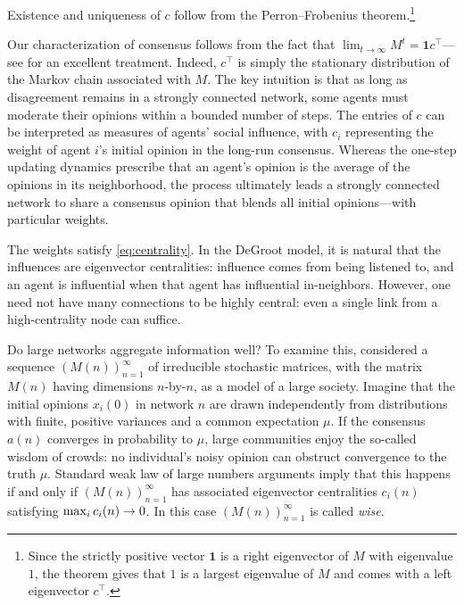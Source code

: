 \documentclass{notices}
\theoremstyle{definition}\newtheorem{problem}{Problem}
\theoremstyle{definition} \newtheorem{remark}{Remark}
\theoremstyle{definition} \newtheorem{claim}{Claim}
\renewcommand{\max}{\operatornamewithlimits{max}}
\theoremstyle{definition} \newtheorem{thm}{Theorem}
\theoremstyle{definition} \newtheorem*{thmNoNum}{Theorem}
\theoremstyle{definition} \newtheorem{definition}{Definition}
\theoremstyle{definition} \theoremstyle{remark}
\theoremstyle{definition} \newtheorem{note}{Note}
\theoremstyle{definition} \newtheorem{notation}{Notation}
\theoremstyle{definition} \theoremstyle{plain}
\theoremstyle{definition} \newtheorem{condition}{Condition}
\theoremstyle{definition} \newtheorem{lem}{Lemma}
\theoremstyle{definition} \newtheorem{corollary}{Corollary}
\theoremstyle{definition} \newtheorem{prop}{Proposition}
\theoremstyle{definition} \newtheorem{ax}{Axiom}
\theoremstyle{definition} \newtheorem{assumption}{Assumption}
\theoremstyle{definition} \newtheorem{example}{Example}
\theoremstyle{definition} \newtheorem{rmk}{Remark}
\theoremstyle{definition} \newtheorem{res}{Result}
\theoremstyle{definition} \newtheorem{que}{Question}
\theoremstyle{definition} \newtheorem{conjecture}{Conjecture}
\theoremstyle{definition}
\begin{document}
Existence and uniqueness of $c$ follow from the Perron--Frobenius theorem.\footnote{Since the strictly positive vector $\bm{1}$ is a right eigenvector of $M$ with eigenvalue $1$, the theorem gives that $1$ is a largest eigenvalue of $M$ and comes with a left eigenvector $c^\top$.} 

Our characterization of consensus follows from the fact that $\lim_{t \to \infty} M^t = \mathbf{1}  c^\top$---see \cite[Ch. 8]{meyer-book} for an excellent treatment. Indeed, $c^\top$ is simply the stationary distribution of the Markov chain associated with $M$. The key intuition is that as long as disagreement remains in a strongly connected network, some agents must moderate their opinions within a bounded number of steps. The entries of $c$ can be interpreted as measures of agents' social influence, with $c_i$ representing the weight of agent $i$'s initial opinion in the long-run consensus. Whereas the one-step updating dynamics prescribe that an agent's opinion is the average of the opinions in its neighborhood,  the process ultimately leads a strongly connected network to share a consensus opinion that blends all initial opinions---with particular weights.

The weights satisfy \cref{eq:centrality}. In the DeGroot model, it is natural that the influences are eigenvector centralities: influence comes from being listened to, and  an agent is influential when that agent has influential in-neighbors. However, one need not have many connections to be highly central: even a single link from a high-centrality node can suffice. 


Do large networks aggregate information well? To examine this, \cite{GolubJackson2010} considered a sequence $(M(n))_{n=1}^\infty$ of irreducible stochastic matrices, with the matrix $M(n)$ having dimensions $n$-by-$n$, as a model of a large society. Imagine that the initial opinions $x_i(0)$ in network $n$ are drawn independently from distributions with finite, positive variances and a common expectation $\mu$. If the consensus $a(n)$ converges in probability to $\mu$, large communities enjoy the so-called wisdom of crowds: no individual's noisy opinion can obstruct convergence to the truth $\mu$. Standard weak law of large numbers arguments imply that this happens if and only if $(M(n))_{n=1}^\infty$ has associated eigenvector centralities $c_i(n)$ satisfying $\max_i c_i(n) \to 0$. In this case $(M(n))_{n=1}^\infty$ is called \emph{wise}.
\end{document}
